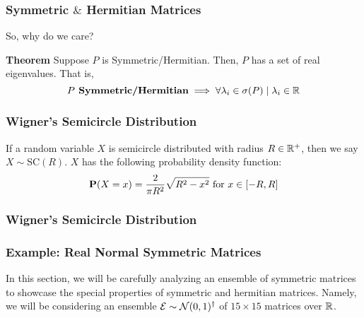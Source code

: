\begin{frame} \frametitle{Symmetric $\&$ Hermitian Matrices}

So, why do we care?

\begin{alertblock}{\textbf{Theorem}}
Suppose $P$ is Symmetric/Hermitian. Then, $P$ has a set of real eigenvalues. That is,
$$P \textbf{ Symmetric/Hermitian} \implies \forall \lambda_i \in \sigma(P) \mid \lambda_i \in \mathbb{R}$$
\end{alertblock}

\end{frame}

\begin{frame} \frametitle{Wigner's Semicircle Distribution}

\begin{alertblock}{}
If a random variable $X$ is semicircle distributed with radius $R \in \mathbb{R}^+$, then we say $X \sim \text{SC}(R)$. $X$ has the following probability density function:
$$\textbf{P}(X = x) = \frac{2}{\pi R^2} \sqrt{R^2 - x^2} \text{ for } x \in [-R, R]$$
\end{alertblock}

\end{frame}

\begin{frame} \frametitle{Wigner's Semicircle Distribution}


\end{frame}

\begin{frame} \frametitle{Example: Real Normal Symmetric Matrices}

  In this section, we will be carefully analyzing an ensemble of symmetric matrices to showcase
  the special properties of symmetric and hermitian matrices.
  Namely, we will be considering an ensemble $\mathcal{E} \sim \mathcal{N}(0,1)^\dagger$ of $15 \times 15$ matrices over $\mathbb{R}$.

\end{frame}

